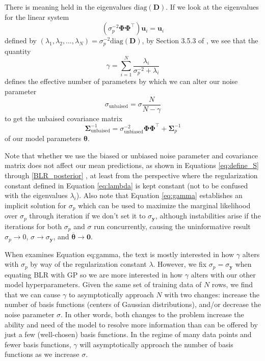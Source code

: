 \documentclass{article}
\begin{document}
There is meaning held in the eigenvalues $\text{diag}(\mathbf{D})$. If we look at the eigenvalues for the linear system \begin{equation}\left(\sigma_p^{-2}\boldsymbol{\Phi}\boldsymbol{\Phi}^\top\right)\mathbf{u}_i=\mathbf{u}_i\end{equation} defined by $(\lambda_1,\lambda_2,\dots,\lambda_N)=\sigma_p^{-2}\text{diag}(\mathbf{D})$, by Section 3.5.3 of \cite{bishop}, we see that the quantity
\begin{equation}
\label{eq:gamma}
\gamma=\sum_{i=1}^{N}\frac{\lambda_i}{\sigma_p^{-2} + \lambda_i}
\end{equation} defines the effective number of parameters by which we can alter our noise parameter \begin{equation}\sigma_\text{unbaised}=\sigma\frac{N}{N-\gamma}\end{equation} to get the unbaised covariance matrix \begin{equation}\boldsymbol{\Sigma}_\text{unbaised}^{-1}=\sigma_\text{unbiased}^{-2}\boldsymbol{\Phi}\boldsymbol{\Phi}^\top+\boldsymbol{\Sigma}_p^{-1}\end{equation} of our model parameters $\boldsymbol{\theta}$. 

Note that whether we use the biased or unbiased noise parameter and covariance matrix does not affect our mean predictions, as shown in Equations \ref{eq:define_S} through \ref{BLR_posterior} , at least from the perspective where the regularization constant defined in Equation \ref{eq:lambda} is kept constant (not to be confused with the eigenvalues  $\lambda_i$). Also note that Equation \ref{eq:gamma} establishes an implicit solution for $\sigma_p$ which can be used to maximize the marginal likelihood over $\sigma_p$ through iteration if we don't set it to $\sigma_\mathbf{y}$, although instabilities arise if the iterations for both $\sigma_p$ and $\sigma$ run concurrently, causing the uninformative result $\sigma_p\rightarrow 0$, $\sigma \rightarrow \sigma_\mathbf{y}$, and $\overline{\boldsymbol{\theta}} \rightarrow \mathbf{0}$. 

When \cite{bishop} examines Equation {eq:gamma}, the text is mostly interested in how $\gamma$ alters with $\sigma_p$ by way of the regularization constant $\lambda$. However, we fix $\sigma_p=\sigma_\mathbf{y}$ when equating BLR with GP so we are more interested in how $\gamma$ alters with our other model hyperparameters. Given the same set of training data of $N$ rows, we find that we can cause $\gamma$ to asymptotically approach $N$ with two changes: increase the number of basis functions (centers of Gaussian distributions), and/or decrease the noise parameter $\sigma$. In other words, both changes to the problem increase the ability and need of the model to resolve more information than can be offered by just a few (well-chosen) basis functions. In the regime of many data points and fewer basis functions, $\gamma$ will asymptotically approach the number of basis functions as we increase $\sigma$.
\end{document}
